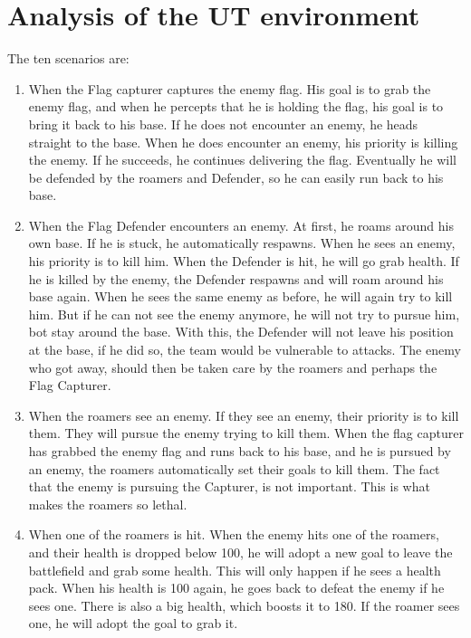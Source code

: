 \chapter{Analysis of the UT environment}
The ten scenarios are:
\begin{enumerate}
	\item When the Flag capturer captures the enemy flag. His goal is to grab the enemy flag, and when he percepts that he is holding the flag, his goal is to bring it back to his base. If he does not encounter an enemy, he heads straight to the base. When he does encounter an enemy, his priority is killing the enemy. If he succeeds, he continues delivering the flag. Eventually he will be defended by the roamers and Defender, so he can easily run back to his base.\\
	\item When the Flag Defender encounters an enemy. At first, he roams around his own base. If he is stuck, he automatically respawns. When he sees an enemy, his priority is to kill him. When the Defender is hit, he will go grab health. If he is killed by the enemy, the Defender respawns and will roam around his base again. When he sees the same enemy as before, he will again try to kill him. But if he can not see the enemy anymore, he will not try to pursue him, bot stay around the base. With this, the Defender will not leave his position at the base, if he did so, the team would be vulnerable to attacks. The enemy who got away, should then be taken care by the roamers and perhaps the Flag Capturer.\\
	\item When the roamers see an enemy. If they see an enemy, their priority is to kill them. They will pursue the enemy trying to kill them. When the flag capturer has grabbed the enemy flag and runs back to his base, and he is pursued by an enemy, the roamers automatically set their goals to kill them. The fact that the enemy is pursuing the Capturer, is not important. This is what makes the roamers so lethal. \\
	\item When one of the roamers is hit. When the enemy hits one of the roamers, and their health is dropped below 100, he will adopt a new goal to leave the battlefield and grab some health. This will only happen if he sees a health pack. When his health is 100 again, he goes back to defeat the enemy if he sees one. There is also a big health, which boosts it to 180. If the roamer sees one, he will adopt the goal to grab it.\\

\end{enumerate}
